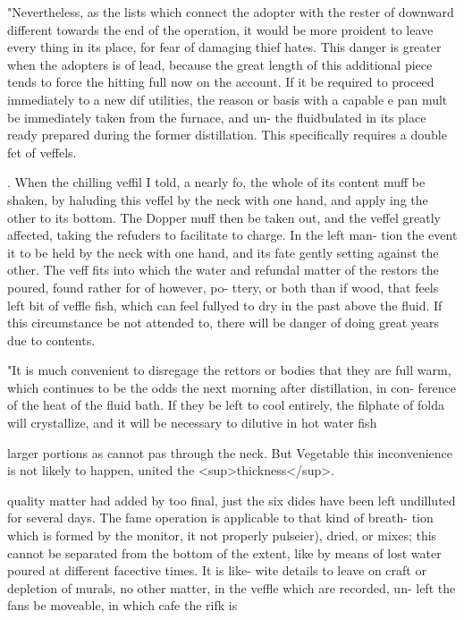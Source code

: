 "Nevertheless, as the lists which connect the adopter
with the rester of downward different towards the end
of the operation, it would be more proident to leave
every thing in its place, for fear of damaging thief
hates. This danger is greater when the adopters is of
lead, because the great length of this additional piece
tends to force the hitting full now on the account.
If it be required to proceed immediately to a new dif
utilities, the reason or basis with a capable e pan
mult be immediately taken from the furnace, and un-
the fluidbulated in its place ready prepared during the
former distillation. This specifically requires a double
fet of veffels.\par{}. When the chilling veffil I told, a nearly
fo, the whole of its content muff be shaken, by haluding
this veffel by the neck with one hand, and apply
ing the other to its bottom. The Dopper muff then
be taken out, and the veffel greatly affected, taking
the refuders to facilitate to charge. In the left man-
tion the event it to be held by the neck with one hand,
and its fate gently setting against the other. The veff
fits into which the water and refundal matter of the
restors the poured, found rather for of however, po-
ttery, or both than if wood, that feels left bit of veffle
fish, which can feel fullyed to dry in the past above the
fluid. If this circumstance be not attended to, there
will be danger of doing great years due to contents.\par\medskip
"It is much convenient to disregage the rettors or
bodies that they are full warm, which continues to
be the odds the next morning after distillation, in con-
ference of the heat of the fluid bath. If they be left
to cool entirely, the filphate of folda will crystallize,
and it will be necessary to dilutive in hot water fish\par\medskip
larger portions as cannot pas through the neck. But Vegetable
this inconvenience is not likely to happen, united the <sup>thickness</sup>.\par\medskip
quality matter had added by too final, just the six
dides have been left undilluted for several days. The
fame operation is applicable to that kind of breath-
tion which is formed by the monitor, it not properly
pulseier), dried, or mixes; this cannot be separated
from the bottom of the extent, like by means of lost
water poured at different facective times. It is like-
wite details to leave on craft or depletion of murals,
no other matter, in the veffle which are recorded, un-
left the fans be moveable, in which cafe the rifk is
